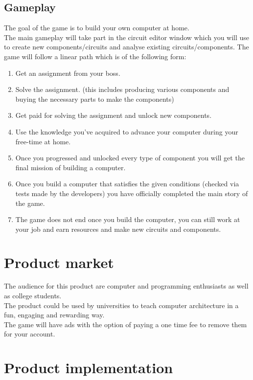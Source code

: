 \documentclass[12pt]{article}
\begin{document}
\subsection{Gameplay}
The goal of the game is to build your own computer at home.\\
The main gameplay will take part in the circuit editor window which you will use to create new components/circuits 
and analyse existing circuits/components.
The game will follow a linear path which is of the following form:
\begin{enumerate}
    \item Get an assignment from your boss.
    \item Solve the assignment. (this includes producing various components and buying the necessary parts to make the components)
    \item Get paid for solving the assignment and unlock new components.
    \item Use the knowledge you've acquired to advance your computer during your free-time at home.
    \pagebreak
    \item Once you progressed and unlocked every type of component you will get the final mission of building a computer.
    \item Once you build a computer that satisfies the given conditions (checked via tests made by the developers) you have officially completed the main story of the game.
    \item The game does not end once you build the computer, you can still work at your job and earn resources and make new circuits and components.
\end{enumerate}



\section{Product market}
The audience for this product are computer and programming enthusiasts as well as college students.\\
The product could be used by universities to teach computer architecture in a fun, engaging and rewarding way.\\
The game will have ads with the option of paying a one time fee to remove them for your account.
\section{Product implementation}
\end{document}
